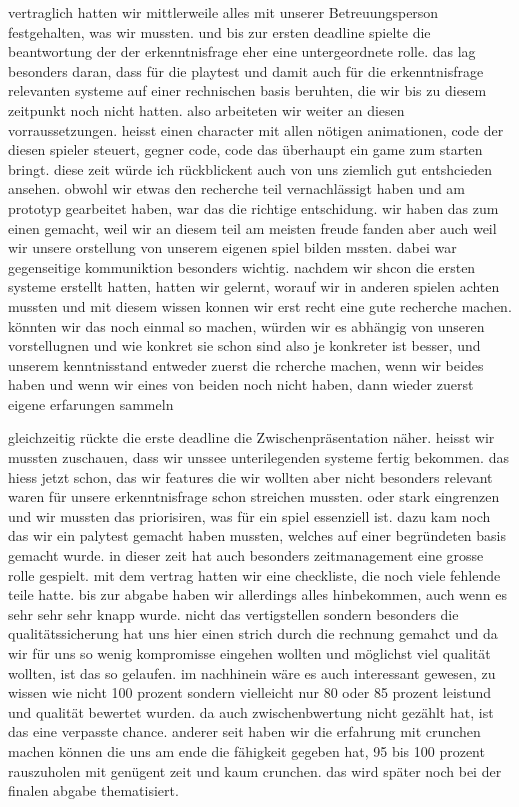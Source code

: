 \documentclass[../Main.tex]{subfiles}
\begin{document}
vertraglich hatten wir mittlerweile alles mit unserer Betreuungsperson festgehalten, was wir mussten. und bis zur ersten deadline spielte die beantwortung der der erkenntnisfrage eher eine untergeordnete rolle. das lag besonders daran, dass für die playtest und damit auch für die erkenntnisfrage relevanten systeme auf einer rechnischen basis beruhten, die wir bis zu diesem zeitpunkt noch nicht hatten. also arbeiteten wir weiter an diesen vorraussetzungen. heisst einen character mit allen nötigen animationen, code der diesen spieler steuert, gegner code, code das überhaupt ein game zum starten bringt. diese zeit würde ich rückblickent auch von uns ziemlich gut entshcieden ansehen. obwohl wir etwas den recherche teil vernachlässigt haben und am prototyp gearbeitet haben, war das die richtige entschidung. wir haben das zum einen gemacht, weil wir an diesem teil am meisten freude fanden aber auch weil wir unsere orstellung von unserem eigenen spiel bilden mssten. dabei war gegenseitige kommuniktion besonders wichtig. nachdem wir shcon die ersten systeme erstellt hatten, hatten wir gelernt, worauf wir in anderen spielen achten mussten und mit diesem wissen konnen wir erst recht eine gute recherche machen. könnten wir das noch einmal so machen, würden wir es abhängig von unseren vorstellugnen und wie konkret sie schon sind also je konkreter ist besser, und unserem kenntnisstand entweder zuerst die rcherche machen, wenn wir beides haben und wenn wir eines von beiden noch nicht haben, dann wieder zuerst eigene erfarungen sammeln

gleichzeitig rückte die erste deadline die Zwischenpräsentation näher. heisst wir mussten zuschauen, dass wir unssee unterilegenden systeme fertig bekommen. das hiess jetzt schon, das wir features die wir wollten aber nicht besonders relevant waren für unsere erkenntnisfrage schon streichen mussten. oder stark eingrenzen und wir mussten das priorisiren, was für ein spiel essenziell ist. dazu kam noch das wir ein palytest gemacht haben mussten, welches auf einer begründeten basis gemacht wurde. in dieser zeit hat auch besonders zeitmanagement eine grosse rolle gespielt. mit dem vertrag hatten wir eine checkliste, die noch viele fehlende teile hatte. bis zur abgabe haben wir allerdings alles hinbekommen, auch wenn es sehr sehr sehr knapp wurde. nicht das vertigstellen sondern besonders die qualitätssicherung hat uns hier einen strich durch die rechnung gemahct und da wir für uns so wenig kompromisse eingehen wollten und möglichst viel qualität wollten, ist das so gelaufen. im nachhinein wäre es auch interessant gewesen, zu wissen wie nicht 100 prozent sondern vielleicht nur 80 oder 85 prozent leistund und qualität bewertet wurden. da auch zwischenbwertung nicht gezählt hat, ist das eine verpasste chance. anderer seit haben wir die erfahrung mit crunchen machen können die uns am ende die fähigkeit gegeben hat, 95 bis 100 prozent rauszuholen mit genügent zeit und kaum crunchen. das wird später noch bei der finalen abgabe thematisiert.
\end{document}

